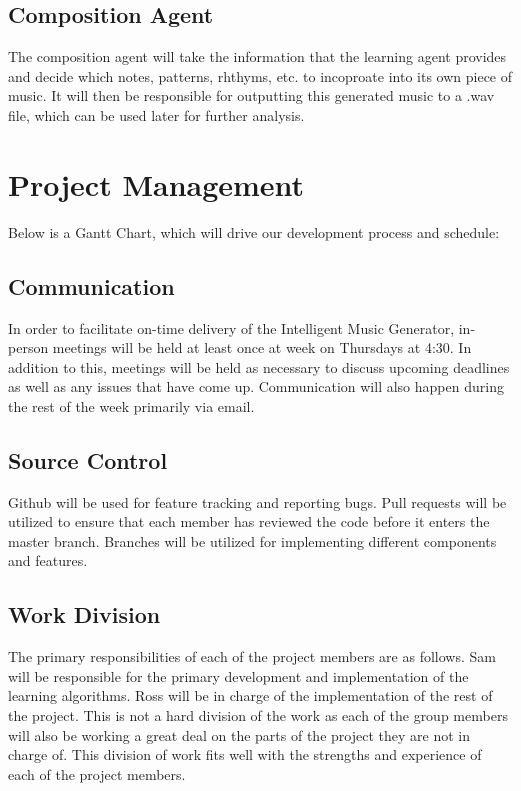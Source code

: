 \documentclass{article}
\begin{document}
\subsection{Composition Agent}
The composition agent will take the information that the learning agent provides and decide which notes, patterns, rhthyms, etc. to incoproate into its own piece of music. It will then be responsible for outputting this generated music to a .wav file, which can be used later for further analysis.

\section{Project Management}
Below is a Gantt Chart, which will drive our development process and schedule:
\begin{figure}[ht]
\end{figure}

\subsection{Communication}
In order to facilitate on-time delivery of the Intelligent Music Generator, in-person meetings will be held at least once at week on Thursdays at 4:30. In addition to this, meetings will be held as necessary to discuss upcoming deadlines as well as any issues that have come up. Communication will also happen during the rest of the week primarily via email.

\subsection{Source Control}
Github will be used for feature tracking and reporting bugs.  Pull requests will be utilized to ensure that each member has reviewed the code before it enters the master branch.  Branches will be utilized for implementing different components and features.

\subsection{Work Division}
The primary responsibilities of each of the project members are as follows. Sam will be responsible for the primary development and implementation of the learning algorithms. Ross will be in charge of the implementation of the rest of the project. This is not a hard division of the work as each of the group members will also be working a great deal on the parts of the project they are not in charge of. This division of work fits well with the strengths and experience of each of the project members.
\end{document}
